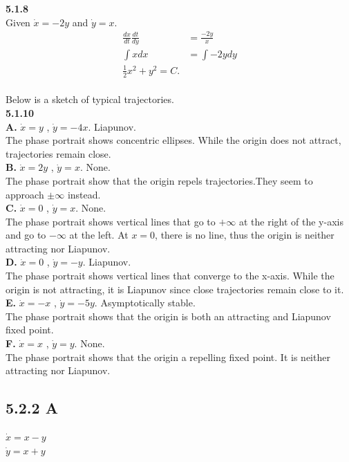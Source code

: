 \documentclass[]{article}
\begin{document}
	\textbf{5.1.8}\\
	
	Given $\dot{x} = -2y$ and $\dot{y}=x$. 
	\begin{align*}
	\frac{dx}{dt} \frac{dt}{dy} &= \frac{-2y}{x}\\
	\int xdx &= \int -2ydy \\
	\frac{1}{2}x^2 + y^2 = C.
	\end{align*}
	\\Below is a sketch of typical trajectories. \\
	
	\textbf{5.1.10}\\
	\textbf{A.} $\dot{x}=y$ , $\dot{y}=-4x$. Liapunov. \\
	The phase portrait shows concentric ellipses. While the origin does not attract, trajectories remain close.\\
	
	\textbf{B.} $\dot{x}=2y$ , $\dot{y}=x$. None. \\
	The phase portrait show that the origin repels trajectories.They seem to approach $\pm \infty$ instead.\\
	
	\textbf{C.} $\dot{x}=0$ , $\dot{y}=x$. None. \\
	The phase portrait shows vertical lines that go to $+ \infty$ at the right of the y-axis and go to $ - \infty$ at the left. At $x=0$, there is no line, thus the origin is neither attracting nor Liapunov.\\
	
	\textbf{D.} $\dot{x}=0$ , $\dot{y}=-y$. Liapunov. \\
	The phase portrait shows vertical lines that converge to the x-axis. While the origin is not attracting, it is Liapunov since close trajectories remain close to it.\\
	
	\textbf{E.} $\dot{x}=-x$ , $\dot{y}=-5y$. Asymptotically stable. \\
	The phase portrait shows that the origin is both an attracting and Liapunov fixed point.\\
	
	\textbf{F.} $\dot{x}=x$ , $\dot{y}=y$. None. \\
	The phase portrait shows that the origin a repelling fixed point. It is neither attracting nor Liapunov.
	
	\subsection*{5.2.2 A}
	$\dot x = x - y$\\
	$\dot y = x + y$\\
	
\end{document}
